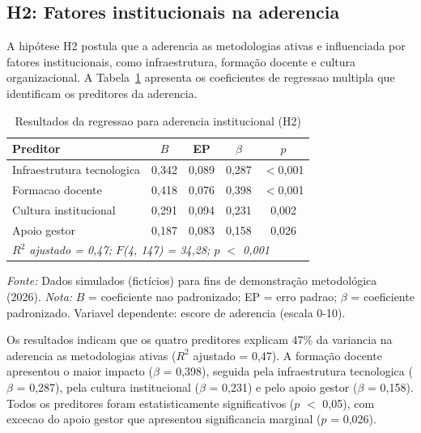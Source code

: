 \subsection{H2: Fatores institucionais na aderencia}
\label{subsec:h2_institucional}

A hipótese H2 postula que a aderencia as metodologias ativas e influenciada por fatores institucionais, como infraestrutura, formação docente e cultura organizacional. A Tabela~\ref{tab:resultado_h2} apresenta os coeficientes de regressao multipla que identificam os preditores da aderencia.

\begin{table}[htbp]
    \centering
    \caption{Resultados da regressao para aderencia institucional (H2)}
    \label{tab:resultado_h2}
    \small
    \begin{tabular}{lcccc}
        \toprule
        \textbf{Preditor} & \textbf{$B$} & \textbf{EP} & \textbf{$\beta$} & \textbf{$p$} \\
        \midrule
        Infraestrutura tecnologica & 0,342 & 0,089 & 0,287 & $<$0,001 \\
        Formacao docente & 0,418 & 0,076 & 0,398 & $<$0,001 \\
        Cultura institucional & 0,291 & 0,094 & 0,231 & 0,002 \\
        Apoio gestor & 0,187 & 0,083 & 0,158 & 0,026 \\
        \midrule
        \multicolumn{5}{l}{\textit{$R^2$ ajustado = 0,47; $F$(4, 147) = 34,28; $p$ $<$ 0,001}} \\
        \bottomrule
    \end{tabular}
    \par\medskip
    \footnotesize{\textit{Fonte:} Dados simulados (fictícios) para fins de demonstração metodológica (2026). \textit{Nota:} $B$ = coeficiente nao padronizado; EP = erro padrao; $\beta$ = coeficiente padronizado. Variavel dependente: escore de aderencia (escala 0-10).}
\end{table}

Os resultados indicam que os quatro preditores explicam 47\% da variancia na aderencia as metodologias ativas ($R^2$ ajustado = 0,47). A formação docente apresentou o maior impacto ($\beta$ = 0,398), seguida pela infraestrutura tecnologica ($\beta$ = 0,287), pela cultura institucional ($\beta$ = 0,231) e pelo apoio gestor ($\beta$ = 0,158). Todos os preditores foram estatisticamente significativos ($p$ $<$ 0,05), com excecao do apoio gestor que apresentou significancia marginal ($p$ = 0,026).

